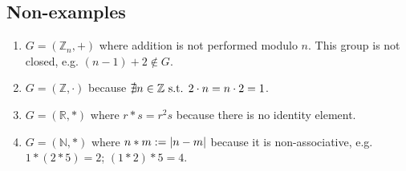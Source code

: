 \subsection{Non-examples}
\begin{enumerate}
	\item \(G = (\mathbb Z_n, +)\) where addition is not performed modulo \(n\).
	      This group is not closed, e.g.
	      \((n-1) + 2 \notin G\).
	\item \(G = (\mathbb Z, \cdot)\) because \(\nexists n\in \mathbb Z \text{ s.t. } 2 \cdot n = n \cdot 2 = 1\).
	\item \(G = (\mathbb R, \ast)\) where \(r \ast s = r^2 s\) because there is no identity element.
	\item \(G = (\mathbb N, \ast)\) where \(n \ast m := \abs{n - m}\) because it is non-associative, e.g.
	      \(1 \ast (2 \ast 5) = 2\); \((1 \ast 2) \ast 5 = 4\).
\end{enumerate}

